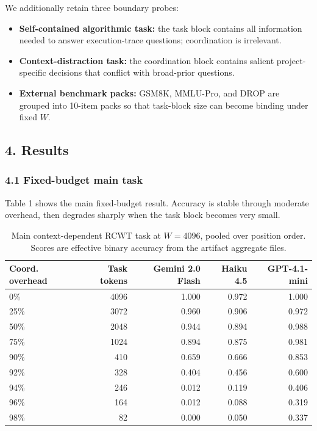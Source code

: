 \documentclass[
  runningheads]{llncs}
\providecommand{\tightlist}{%
  \setlength{\itemsep}{0pt}\setlength{\parskip}{0pt}}
\begin{document}
We additionally retain three boundary probes:

\begin{itemize}
\tightlist
\item
  \textbf{Self-contained algorithmic task:} the task block contains all
  information needed to answer execution-trace questions; coordination
  is irrelevant.
\item
  \textbf{Context-distraction task:} the coordination block contains
  salient project-specific decisions that conflict with broad-prior
  questions.
\item
  \textbf{External benchmark packs:} GSM8K, MMLU-Pro, and DROP are
  grouped into 10-item packs so that task-block size can become binding
  under fixed \(W\).
\end{itemize}

\subsection{4. Results}\label{results}

\subsubsection{4.1 Fixed-budget main task}\label{fixed-budget-main-task}

Table 1 shows the main fixed-budget result. Accuracy is stable through
moderate overhead, then degrades sharply when the task block becomes
very small.

\begin{table}[t]
\centering
\small
\caption{Main context-dependent RCWT task at $W=4096$, pooled over position order. Scores are effective binary accuracy from the artifact aggregate files.}
\begin{tabular}{lrrrr}
\toprule
Coord. overhead & Task tokens & Gemini 2.0 Flash & Haiku 4.5 & GPT-4.1-mini \\
\midrule
0\%  & 4096 & 1.000 & 0.972 & 1.000 \\
25\% & 3072 & 0.960 & 0.906 & 0.972 \\
50\% & 2048 & 0.944 & 0.894 & 0.988 \\
75\% & 1024 & 0.894 & 0.875 & 0.981 \\
90\% & 410  & 0.659 & 0.666 & 0.853 \\
92\% & 328  & 0.404 & 0.456 & 0.600 \\
94\% & 246  & 0.012 & 0.119 & 0.406 \\
96\% & 164  & 0.012 & 0.088 & 0.319 \\
98\% & 82   & 0.000 & 0.050 & 0.337 \\
\bottomrule
\end{tabular}
\end{table}
\end{document}
